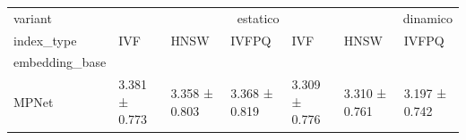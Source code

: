 \begin{tabular}{lllllll}
\toprule
variant & \multicolumn{3}{r}{estatico} & \multicolumn{3}{r}{dinamico} \\
index_type & IVF & HNSW & IVFPQ & IVF & HNSW & IVFPQ \\
embedding_base &  &  &  &  &  &  \\
\midrule
MPNet & 3.381 ± 0.773 & 3.358 ± 0.803 & 3.368 ± 0.819 & 3.309 ± 0.776 & 3.310 ± 0.761 & 3.197 ± 0.742 \\
\bottomrule
\end{tabular}
